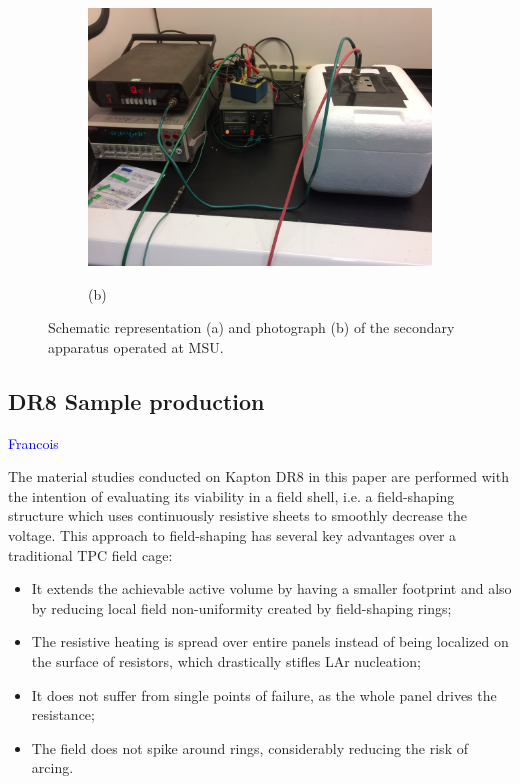 \documentclass[a4paper,12pt]{article}
\begin{document}
\begin{figure}[htb]
\begin{subfigure}[c]{0.39\linewidth}
\begin{center}
		\includegraphics[width=\linewidth]{MSU_styro_setup_picture.jpg}
		\vspace*{3em} 
		
		(b)
	\end{center}
\end{subfigure}
\caption{Schematic representation (a) and photograph (b) of the secondary apparatus operated at MSU.}
\label{fig:msu_styro_setup}
\end{figure}


\subsection{DR8 Sample production}
\label{sec:field_shell}
\textcolor{blue}{Francois}

The material studies conducted on Kapton DR8 in this paper are performed with the intention of evaluating its viability in a field shell, i.e. a field-shaping structure which uses continuously resistive sheets to smoothly decrease the voltage. This approach to field-shaping has several key advantages over a traditional TPC field cage:

\begin{itemize}
\item It extends the achievable active volume by having a smaller footprint and also by reducing local field non-uniformity created by field-shaping rings;
\item The resistive heating is spread over entire panels instead of being localized on the surface of resistors, which drastically stifles LAr nucleation;
\item It does not suffer from single points of failure, as the whole panel drives the resistance;
\item The field does not spike around rings, considerably reducing the risk of arcing.
\end{itemize}
\end{document}
